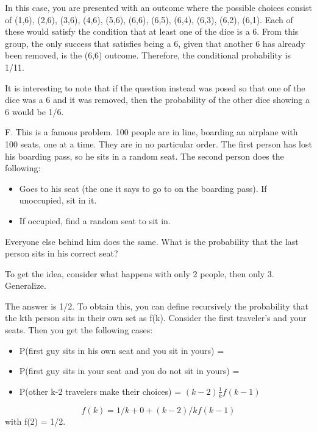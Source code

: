 \documentclass[10pt,]{book}
\theoremstyle{plain}
\theoremstyle{definition}
\theoremstyle{definition}
\theoremstyle{definition}
\numberwithin{equation}{section}
\begin{document}
	In this case, you are presented with an outcome where the possible choices consist of (1,6), (2,6), (3,6), (4,6), (5,6), (6,6), (6,5), (6,4), (6,3), (6,2), (6,1).  Each of these would satisfy the condition that at least one of the dice is a 6. From this group, the only success that satisfies being a 6, given that another 6 has already been removed, is the (6,6) outcome. Therefore, the conditional probability is 1/11.
\par

	It is interesting to note that if the question instead was posed so that one of the dice was a 6 and it was removed, then the probability of the other dice showing a 6 would be 1/6.
\par

	F. This is a famous problem.  100 people are in line, boarding an airplane with 100 seats, one at a time. They are in no particular order. The first person has lost his boarding pass, so he sits in a random seat. The second person does the following:

	\leavevmode%
\begin{itemize}[label=\textbullet]
\item{}Goes to his seat (the one it says to go to on the boarding pass). If unoccupied, sit in it.%
\item{}If occupied, find a random seat to sit in.%
\end{itemize}

	Everyone else behind him does the same. What is the probability that the last person sits in his correct seat?

	
	To get the idea, consider what happens with only 2 people, then only 3. Generalize. 
\par

	The answer is 1/2. To obtain this, you can define recursively the probability that the kth person sits in their own set as f(k).  Consider the first traveler's and your seats. Then you get the following cases:
	\leavevmode%
\begin{itemize}[label=\textbullet]
\item{}P(first guy sits in his own seat and you sit in yours) =  %
\item{}P(first guy sits in your seat and you do not sit in yours) =  %
\item{}P(other k-2 travelers make their choices) = \((k-2) \frac{1}{k} f(k-1)\)%
\end{itemize}

	\begin{equation*}f(k) = 1/k + 0 + (k-2)/k f(k-1)\end{equation*}
	with f(2) = 1/2.
\par
\end{document}
